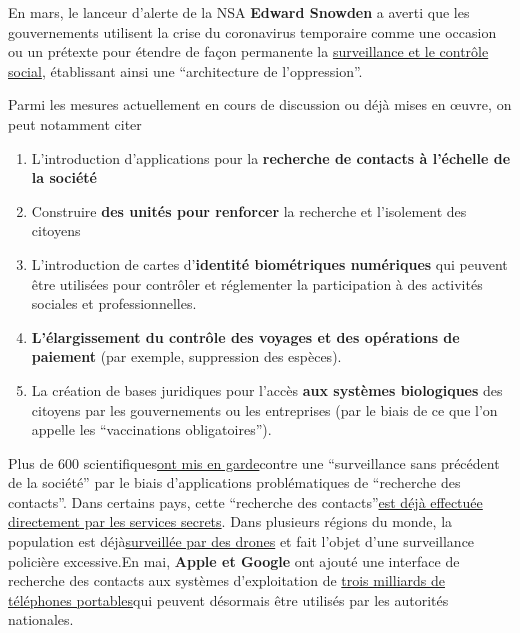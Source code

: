 En mars, le lanceur d'alerte de la NSA \textbf{Edward Snowden} a averti
que les gouvernements utilisent la crise du coronavirus temporaire comme
une occasion ou un prétexte pour étendre de façon permanente la
\href{https://www.youtube.com/watch?v=-pcQFTzck_c}{surveillance et le
contrôle social}, établissant ainsi une ``architecture de
l'oppression''.

Parmi les mesures actuellement en cours de discussion ou déjà mises en
œuvre, on peut notamment citer

\begin{enumerate}
\def\labelenumi{\arabic{enumi}.}
\tightlist
\item
  L'introduction d'applications pour la \textbf{recherche de contacts à
  l'échelle de la société}
\item
  Construire \textbf{des unités pour renforcer} la recherche et
  l'isolement des citoyens
\item
  L'introduction de cartes d'\textbf{identité biométriques numériques}
  qui peuvent être utilisées pour contrôler et réglementer la
  participation à des activités sociales et professionnelles.
\item
  \textbf{L'élargissement du contrôle des voyages et des opérations de
  paiement} (par exemple, suppression des espèces).
\item
  La création de bases juridiques pour l'accès \textbf{aux systèmes
  biologiques} des citoyens par les gouvernements ou les entreprises
  (par le biais de ce que l'on appelle les ``vaccinations
  obligatoires'').
\end{enumerate}

Plus de 600
scientifiques\href{https://www.esat.kuleuven.be/cosic/sites/contact-tracing-joint-statement/}{ont
mis en garde}contre une ``surveillance sans précédent de la société''
par le biais d'applications problématiques de ``recherche des
contacts''. Dans certains pays, cette ``recherche des
contacts''\href{https://www.jewishpress.com/news/the-courts/state-to-high-court-even-more-shin-bet-involvement-in-fighting-the-coronavirus/2020/04/14/}{est
déjà effectuée directement par les services secrets}. Dans plusieurs
régions du monde, la population est
déjà\href{https://off-guardian.org/2020/04/25/50-headlines-darker-more-of-the-new-normal/}{surveillée
par des drones} et fait l'objet d'une surveillance policière
excessive.En mai, \textbf{Apple et Google} ont ajouté une interface de
recherche des contacts aux systèmes d'exploitation de
\href{https://www.bloomberg.com/news/articles/2020-04-10/apple-google-bring-covid-19-contact-tracing-to-3-billion-people}{trois
milliards de téléphones portables}qui peuvent désormais être utilisés
par les autorités nationales.

